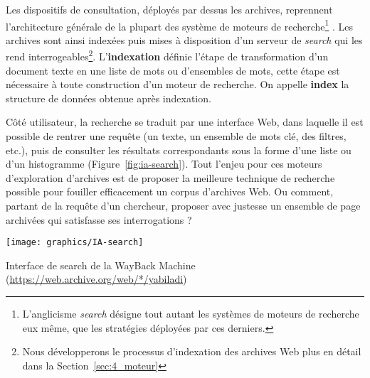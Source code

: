 \documentclass[symmetric,justified,marginals=raggedouter]{tufte-book}
\begin{document}
Les dispositifs de consultation, déployés par dessus les archives, reprennent l'architecture générale de la plupart des système de moteurs de recherche\footnote{\RaggedOuter L'anglicisme \textit{search} désigne tout autant les systèmes de moteurs de recherche eux même, que les stratégies déployées par ces derniers.} \citep{grainger_solr_2014,mccandless_lucene_2010}. Les archives sont ainsi indexées puis mises à disposition d'un serveur de \textit{search} qui les rend interrogeables\footnote{\RaggedOuter Nous développerons le processus d'indexation des archives Web plus en détail dans la Section~\ref{sec:4_moteur}}. L'\textbf{indexation} définie l'étape de transformation d'un document texte en une liste de mots ou d'ensembles de mots, cette étape est nécessaire à toute construction d'un moteur de recherche. On appelle \textbf{index} la structure de données obtenue après indexation. 

Côté utilisateur, la recherche se traduit par une interface Web, dans laquelle il est possible de rentrer une requête (un texte, un ensemble de mots clé, des filtres, etc.), puis de consulter les résultats correspondants sous la forme d'une liste ou d'un histogramme (Figure~\ref{fig:ia-search}). Tout l'enjeu pour ces moteurs d'exploration d'archives est de proposer la meilleure technique de recherche possible pour fouiller efficacement un corpus d'archives Web. Ou comment, partant de la requête d'un chercheur, proposer avec justesse un ensemble de page archivées qui satisfasse ses interrogations ?

\begin{marginfigure}%
  \texttt{[image: graphics/IA-search]}
  \caption{Interface de search de la WayBack Machine (\url{https://web.archive.org/web/*/yabiladi})}
  \label{fig:ia-search}
\end{marginfigure} 
\end{document}
